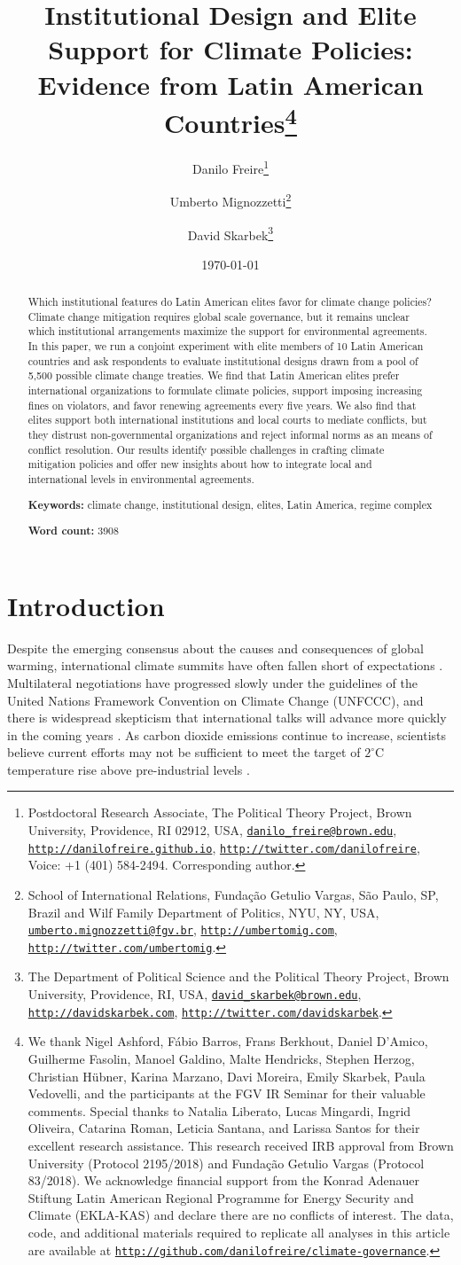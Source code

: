\documentclass[a4paper,12pt]{article}
\title{Institutional Design and Elite Support for Climate Policies: Evidence from Latin American Countries\thanks{We thank Nigel Ashford, F\'{a}bio Barros, Frans Berkhout, Daniel D'Amico, Guilherme Fasolin, Manoel Galdino, Malte Hendricks, Stephen Herzog, Christian H\"{u}bner, Karina Marzano, Davi Moreira, Emily Skarbek, Paula Vedovelli, and the participants at the FGV IR Seminar for their valuable comments. Special thanks to Natalia Liberato, Lucas Mingardi, Ingrid Oliveira, Catarina Roman, Leticia Santana, and Larissa Santos for their excellent research assistance. This research received IRB approval from Brown University (Protocol 2195/2018) and Funda\c{c}\~{a}o Getulio Vargas (Protocol 83/2018). We acknowledge financial support from the Konrad Adenauer Stiftung Latin American Regional Programme for Energy Security and Climate (EKLA-KAS) and declare there are no conflicts of interest. The data, code, and additional materials required to replicate all analyses in this article are available at \href{http://github.com/danilofreire/climate-governance}{\texttt{http://github.com/danilofreire/climate-governance}}.}
}
\author{Danilo Freire\thanks{Postdoctoral Research Associate, The Political Theory Project, Brown University, Providence, RI 02912, USA, \href{mailto:danilo_freire@brown.edu}{\texttt{danilo\_freire@brown.edu}}, \href{http://danilofreire.github.io}{\texttt{http://danilofreire.github.io}}, \href{http://twitter.com/danilofreire}{\texttt{http://twitter.com/danilofreire}}, Voice: +1 (401) 584-2494. Corresponding author.}
\and Umberto Mignozzetti\thanks{School of International Relations, Funda\c{c}\~{a}o Getulio Vargas, S\~{a}o Paulo, SP, Brazil and Wilf Family Department of Politics, NYU, NY, USA, \href{mailto:umberto.mignozzetti@fgv.br}{\texttt{umberto.mignozzetti@fgv.br}}, \href{http://umbertomig.com}{\texttt{http://umbertomig.com}}, \href{http://twitter.com/umbertomig}{\texttt{http://twitter.com/umbertomig}}.}
\and David Skarbek\thanks{The Department of Political Science and the Political Theory Project, Brown University, Providence, RI, USA, \href{mailto:david_skarbek@brown.edu}{\texttt{david\_skarbek@brown.edu}}, \href{http://davidskarbek.com}{\texttt{http://davidskarbek.com}}, \href{http://twitter.com/davidskarbek}{\texttt{http://twitter.com/davidskarbek}}.}
}
\date{\today}
\begin{document}
\maketitle

\begin{abstract}
\onehalfspacing
\noindent 
Which institutional features do Latin American elites favor for climate change policies? Climate change mitigation requires global scale governance, but it remains unclear which institutional arrangements maximize the support for environmental agreements. In this paper, we run a conjoint experiment with elite members of 10 Latin American countries and ask respondents to evaluate institutional designs drawn from a pool of 5,500 possible climate change treaties. We find that Latin American elites prefer international organizations to formulate climate policies, support imposing increasing fines on violators, and favor renewing agreements every five years. We also find that elites support both international institutions and local courts to mediate conflicts, but they distrust non-governmental organizations and reject informal norms as an means of conflict resolution. Our results identify possible challenges in crafting climate mitigation policies and offer new insights about how to integrate local and international levels in environmental agreements. 

\vspace{.5cm}

\noindent 
\textbf{Keywords:} climate change, institutional design, elites, Latin America, regime complex

\vspace{.5cm}

\noindent 
\textbf{Word count:} 3908
\end{abstract}

\newpage

\doublespacing

\section{Introduction}%
\label{sec:introduction}

Despite the emerging consensus about the causes and consequences of global warming, international climate summits have often fallen short of expectations \citep{rogelj2010copenhagen, rosen2015wrong, victor2017prove}. Multilateral negotiations have progressed slowly under the guidelines of the United Nations Framework Convention on Climate Change (UNFCCC), and there is widespread skepticism that international talks will advance more quickly in the coming years \citep{cole2015advantages, hjerpe2015views}. As carbon dioxide emissions continue to increase, scientists believe current efforts may not be sufficient to meet the target of $2^{\circ}$C temperature rise above pre-industrial levels \citep{jordan2015emergence}.
\end{document}

